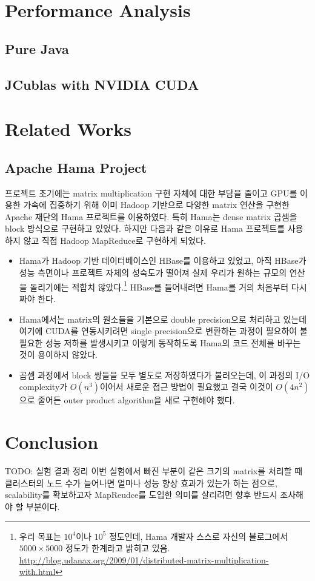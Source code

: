 \documentclass[a4paper]{article}
\begin{document}
\begin{multicols}{2}
\section{Performance Analysis}
\subsection{Pure Java}
\subsection{JCublas with NVIDIA CUDA}

\section{Related Works}
\subsection{Apache Hama Project}
프로젝트 초기에는 matrix multiplication 구현 자체에 대한 부담을 줄이고 GPU를 이용한 가속에 집중하기 위해 이미 Hadoop 기반으로 다양한 matrix 연산을 구현한 Apache 재단의 Hama 프로젝트를 이용하였다.
특히 Hama는 dense matrix 곱셈을 block 방식으로 구현하고 있었다.
하지만 다음과 같은 이유로 Hama 프로젝트를 사용하지 않고 직접 Hadoop MapReduce로 구현하게 되었다.
\begin{itemize}
	\item Hama가 Hadoop 기반 데이터베이스인 HBase를 이용하고 있었고, 아직 HBase가 성능 측면이나 프로젝트 자체의 성숙도가 떨어져 실제 우리가 원하는 규모의 연산을 돌리기에는 적합치 않았다.\footnote{우리 목표는 $10^4$이나 $10^5$ 정도인데, Hama 개발자 스스로 자신의 블로그에서 $5000 \times 5000$ 정도가 한계라고 밝히고 있음.\\\url{http://blog.udanax.org/2009/01/distributed-matrix-multiplication-with.html}}
	HBase를 들어내려면 Hama를 거의 처음부터 다시 짜야 한다.
	\item Hama에서는 matrix의 원소들을 기본으로 double precision으로 처리하고 있는데 여기에 CUDA를 연동시키려면 single precision으로 변환하는 과정이 필요하여 불필요한 성능 저하를 발생시키고 이렇게 동작하도록 Hama의 코드 전체를 바꾸는 것이 용이하지 않았다.
	\item 곱셈 과정에서 block 쌍들을 모두 별도로 저장하였다가 불러오는데, 이 과정의 I/O complexity가 $O(n^3)$이어서 새로운 접근 방법이 필요했고 결국 이것이 $O(4n^2)$으로 줄어든 outer product algorithm을 새로 구현해야 했다.
\end{itemize}

\section{Conclusion}
{\color{BurntOrange} TODO: 실험 결과 정리}
이번 실험에서 빠진 부분이 같은 크기의 matrix를 처리할 때 클러스터의 노드 수가 늘어나면 얼마나 성능 향상 효과가 있는가 하는 점으로, scalability를 확보하고자 MapReudce를 도입한 의미를 살리려면 향후 반드시 조사해야 할 부분이다.


\end{multicols}
\end{document}
